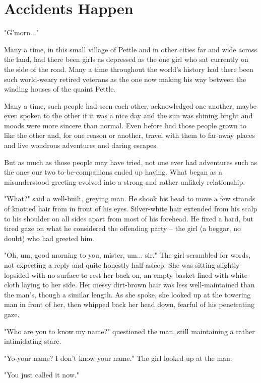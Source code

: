 \chapter{Accidents Happen}

"G'morn..."

Many a time, in this small village of Pettle and in other cities far and wide
across the land, had there been girls as depressed as the one girl who sat
currently on the side of the road. Many a time throughout the world's history
had there been such world-weary retired veterans as the one now making his way
between the winding houses of the quaint Pettle.

Many a time, such people had seen each other, acknowledged one another, maybe
even spoken to the other if it was a nice day and the sun was shining bright and
moods were more sincere than normal. Even before had those people grown to like
the other and, for one reason or another, travel with them to far-away places
and live wondrous adventures and daring escapes.

But as much as those people may have tried, not one ever had adventures such as
the ones our two to-be-companions ended up having. What began as a misunderstood
greeting evolved into a strong and rather unlikely relationship.

"What?" said a well-built, greying man. He shook his head to move a few strands
of knotted hair from in front of his eyes. Silver-white hair extended from his
scalp to his shoulder on all sides apart from most of his forehead. He fixed a
hard, but tired gaze on what he considered the offending party -- the girl (a
beggar, no doubt) who had greeted him.

"Oh, um, good morning to you, mister, um... sir." The girl scrambled for words,
not expecting a reply and quite honestly half-asleep. She was sitting slightly
lopsided with no surface to rest her back on, an empty basket lined with white
cloth laying to her side. Her messy dirt-brown hair was less well-maintained
than the man's, though a similar length. As she spoke, she looked up at the
towering man in front of her, then whipped back her head down, fearful of his
penetrating gaze.

"Who are you to know my name?" questioned the man, still maintaining a rather
intimidating stare.

"Yo-your name? I don't know your name." The girl looked up at the man.

"You just called it now."

